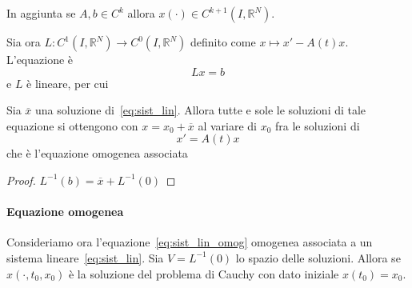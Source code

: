 In aggiunta se \(A, b \in C^{k}\) allora \(x{(\cdot )} \in C^{k+1}{(I,
\mathbb{R}^{N})}\). 

Sia ora \(L: C^{1}{(I, \mathbb{R}^{N})} \to C^{0}{(I, \mathbb{R}^{N})}\)
definito come \(x \mapsto x' - A{(t)}x\). L'equazione è
\begin{equation}
    Lx = b
\end{equation}
e \(L\) è lineare, per cui
\begin{proposition}
    Sia \(\overline{x}\) una soluzione di~\eqref{eq:sist_lin}. Allora tutte e
    sole le soluzioni di tale equazione si ottengono con \(x = x_{0} +
    \overline{x}\) al variare di \(x_{0}\) fra le soluzioni di 
    \begin{equation}\label{eq:sist_lin_omog}
        x' = A{(t)}x
    \end{equation}
    che è l'equazione omogenea associata
\end{proposition}
\begin{proof}
    \(L^{-1}{(b)} = \overline{x} + L^{-1}{(0)}\) 
\end{proof}

\paragraph{Equazione omogenea} Consideriamo ora
l'equazione~\eqref{eq:sist_lin_omog} omogenea associata a
un sistema lineare~\eqref{eq:sist_lin}. Sia \(V = L^{-1}{(0)}\) lo spazio delle
soluzioni. Allora se \(x{(\cdot , t_{0}, x_{0})}\) è la soluzione del problema
di Cauchy con dato iniziale \(x{(t_{0})} = x_{0}\).

